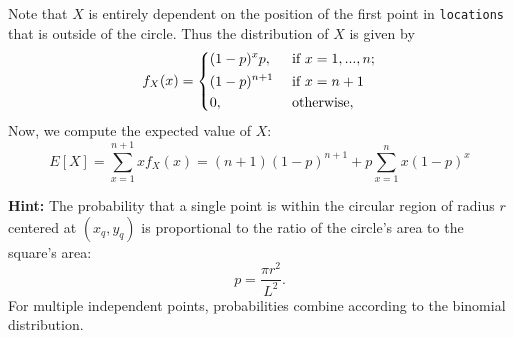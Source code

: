 \documentclass{assignment-263}
\begin{document}
\begin{enumerate}
\begin{enumerate}
    Note that \(X\) is entirely dependent on the position of the first point in \verb|locations| that is outside of the circle. Thus the distribution of \(X\) is given by
    \[
      f_X(x) = \begin{dcases}
        (1 - p)^x p, &\text{ if } x = 1, ..., n ;\\
        (1 - p)^{n+1} &\text{ if } x = n + 1 \\
        0, &\text{ otherwise} ,
      \end{dcases}
    \]
    Now, we compute the expected value of \(X\):
    \[
      E[X] = \sum_{x=1}^{n+1} x f_X(x) = (n + 1)(1 - p)^{n + 1} + p\sum_{x=1}^{n} x(1 - p)^x
    \]
\end{enumerate}

\end{enumerate}

\bigskip

\noindent \textbf{Hint:} The probability that a single point is within the circular region of radius $r$ centered at $(x_q, y_q)$ is proportional to the ratio of the circle's area to the square's area:
\[
p = \frac{\pi r^2}{L^2}.
\]
For multiple independent points, probabilities combine according to the binomial distribution.

\program
\end{document}
